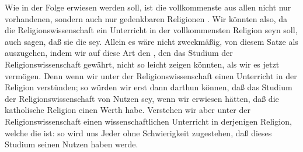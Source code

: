 \begin{aufza}
\item Wie in der Folge erwiesen werden soll, ist die vollkommenste aus allen nicht nur vorhandenen, sondern auch nur gedenkbaren Religionen . Wir könnten also, da die Religionswissenschaft ein Unterricht in der vollkommensten Religion seyn soll, auch sagen, daß sie die  sey. Allein es wäre nicht zweckmäßig, von diesem Satze als  auszugehen, indem wir auf diese Art den , den das Studium der Religionswissenschaft gewährt, nicht so leicht zeigen könnten, als wir es jetzt vermögen. Denn wenn wir unter der Religionswissenschaft einen Unterricht in der  Religion verstünden; so würden wir erst dann darthun können, daß das Studium der Religionswissenschaft von Nutzen sey, wenn wir erwiesen hätten, daß die katholische Religion einen Werth habe. Verstehen wir aber unter der Religionswissenschaft einen wissenschaftlichen Unterricht in derjenigen Religion, welche die  ist: so wird uns Jeder ohne Schwierigkeit zugestehen, daß dieses Studium seinen Nutzen haben werde.
\end{aufza}


